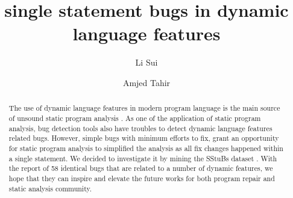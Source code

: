 \documentclass[sigconf,review,anonymous]{acmart}
\begin{document}
\title{single statement bugs in dynamic language features}


\author{Li Sui}

\author{Amjed Tahir}



\begin{abstract}
The use of dynamic language features in modern program language is the main source of unsound static program analysis \cite{livshits2015defense, sui2018soundness}. As one of the application of static program analysis, bug detection tools also have troubles to detect dynamic language features related bugs. However, simple bugs with minimum efforts to fix,  grant an opportunity for static program analysis to simplified the analysis as all fix changes happened within a single statement. We decided to investigate it by mining the SStuBs dataset \cite{karampatsis2020often}. With the report of 58 identical bugs that are related to a number of dynamic features, we hope that they can inspire and elevate the future works for both program repair and static analysis community.
\end{abstract}
\end{document}
